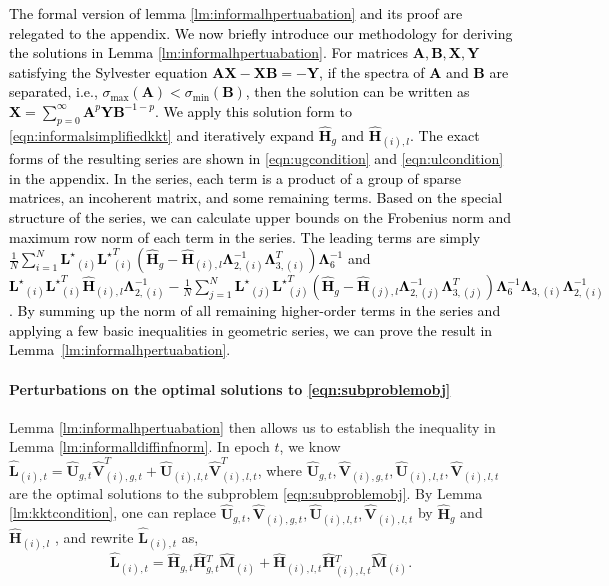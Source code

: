 \documentclass[twoside,11pt]{article}
\newcommand{\revise}[1]{\textcolor{black}{ #1}}
\newcommand{\matA}{\mathbf{A}}
\newcommand{\matB}{\mathbf{B}}
\newcommand{\hmatH}{{\hat{\mathbf{H}}}{}}
\newcommand{\matLst}{{\mathbf{L}^\star}}
\newcommand{\matLambda}{\mathbf{\Lambda}}
\newcommand{\matX}{\mathbf{X}}
\newcommand{\matY}{\mathbf{Y}}
\newcommand{\hmatL}{\hat{\mathbf{L}}}
\newcommand{\hmatM}{\hat{\mathbf{M}}}
\newcommand{\hmatU}{\hat{\mathbf{U}}}
\newcommand{\hmatV}{\hat{\mathbf{V}}}
\begin{document}
\revise{The formal version of lemma \ref{lm:informalhpertuabation} and its proof are relegated to the appendix. We now briefly introduce our methodology for deriving the solutions in Lemma \ref{lm:informalhpertuabation}. For matrices $\matA,\matB,\matX,\matY$ satisfying the Sylvester equation $\matA\matX-\matX\matB=-\matY$, if the spectra of $\matA$ and $\matB$ are separated, i.e., $\sigma_{\max}(\matA)<\sigma_{\min}(\matB)$, then the solution can be written as $\matX=\sum_{p=0}^{\infty} \matA^p\matY\matB^{-1-p}$. We apply this solution form to \eqref{eqn:informalsimplifiedkkt} and iteratively expand $\hmatH_g$ and $\hmatH_{(i),l}$. The exact forms of the resulting series are shown in \eqref{eqn:ugcondition} and \eqref{eqn:ulcondition} in the appendix. In the series, each term is a product of a group of sparse matrices, an incoherent matrix, and some remaining terms. Based on the special structure of the series, we can calculate upper bounds on the Frobenius norm and maximum row norm of each term in the series. The leading terms are simply $\frac{1}{N}\sum_{i=1}^N\matLst_{(i)}\matLst_{(i)}^T\left(\hmatH_{g}-\hmatH_{(i),l}\matLambda_{2,(i)}^{-1}\matLambda_{3,(i)}^T\right) \matLambda_6^{-1}$ and $\matLst_{(i)}\matLst_{(i)}^T \hmatH_{(i),l}\matLambda_{2,(i)}^{-1}- \frac{1}{N}\sum_{j=1}^N\matLst_{(j)}\matLst_{(j)}^T\left(\hmatH_{g}-\hmatH_{(j),l}\matLambda_{2,(j)}^{-1}\matLambda_{3,(j)}^T\right) \matLambda_6^{-1}\matLambda_{3,(i)}\matLambda_{2,(i)}^{-1}$. By summing up the norm of all remaining higher-order terms in the series and applying a few basic inequalities in geometric series, we can prove the result in Lemma~\ref{lm:informalhpertuabation}.}

\paragraph{Perturbations on the optimal solutions to \eqref{eqn:subproblemobj}} Lemma \ref{lm:informalhpertuabation} then allows us to establish the inequality in Lemma \ref{lm:informalldiffinfnorm}. In epoch $t$, we know $\hmatL_{(i),t}=\hmatU_{g,t}\hmatV_{(i),g,t}^T+\hmatU_{(i),l,t}\hmatV_{(i),l,t}^T$, where $\hmatU_{g,t}, \hmatV_{(i),g,t}, \hmatU_{(i),l,t}, \hmatV_{(i),l,t}$ are the optimal solutions to the subproblem \eqref{eqn:subproblemobj}. By Lemma \ref{lm:kktcondition}, one can replace $\hmatU_{g,t}, \hmatV_{(i),g,t}, \hmatU_{(i),l,t}, \hmatV_{(i),l,t}$ by $\hmatH_g$ and $\hmatH_{(i),l}$ 
, and rewrite $\hmatL_{(i),t}$ as, 
$$
\hmatL_{(i),t} = \hmatH_{g,t}\hmatH_{g,t}^T\hmatM_{(i)}+\hmatH_{(i),l,t}\hmatH_{(i),l,t}^T\hmatM_{(i)}.
$$
\end{document}

